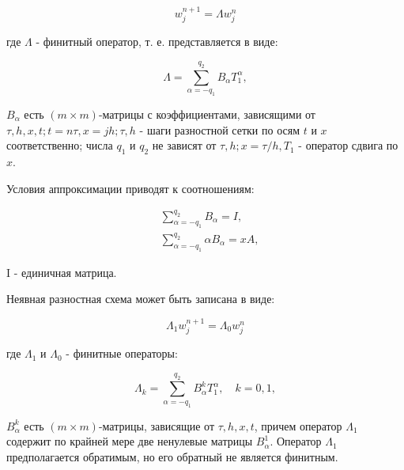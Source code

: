 \documentclass[10pt]{article}
\begin{document}
\[

w_{j}^{n+1}=\Lambda w_{j}^{n}

\]



где $\Lambda$ - финитный оператор, т. е. представляется в виде:



\[

\Lambda=\sum_{\alpha=-q_{1}}^{q_{2}} B_{\alpha} T_{1}^{\alpha},

\]



$B_{\alpha}$ есть $(m \times m)$-матрицы с коэффициентами, зависящими от $\tau, h, x, t ; t=n \tau, x=j h ; \tau, h$ - шаги разностной сетки по осям $t$ и $x$ соответственно; числа $q_{1}$ и $q_{2}$ не зависят от $\tau, h ; x=\tau / h, T_{1}$ - оператор сдвига по $x$.



Условия аппроксимации приводят к соотношениям:



\[

\begin{aligned}

& \sum_{\alpha=-q_{1}}^{q_{2}} B_{\alpha}=I, \\

& \sum_{\alpha=-q_{1}}^{q_{2}} \alpha B_{\alpha}=x A,

\end{aligned}

\]



I - единичная матрица.



Неявная разностная схема может быть записана в виде:



\[

\Lambda_{1} w_{j}^{n+1}=\Lambda_{0} w_{j}^{n}

\]



где $\Lambda_{1}$ и $\Lambda_{0}$ - финитные операторы:



\[

\Lambda_{k}=\sum_{\alpha=-q_{1}}^{q_{2}} B_{\alpha}^{k} T_{1}^{\alpha}, \quad k=0,1,

\]



$B_{\alpha}^{k}$ есть $(m \times m)$-матрицы, зависящие от $\tau, h, x, t$, причем оператор $\Lambda_{1}$ содержит по крайней мере две ненулевые матрицы $B_{\alpha}^{1}$. Оператор $\Lambda_{1}$ предполагается обратимым, но его обратный не является финитным.
\end{document}
